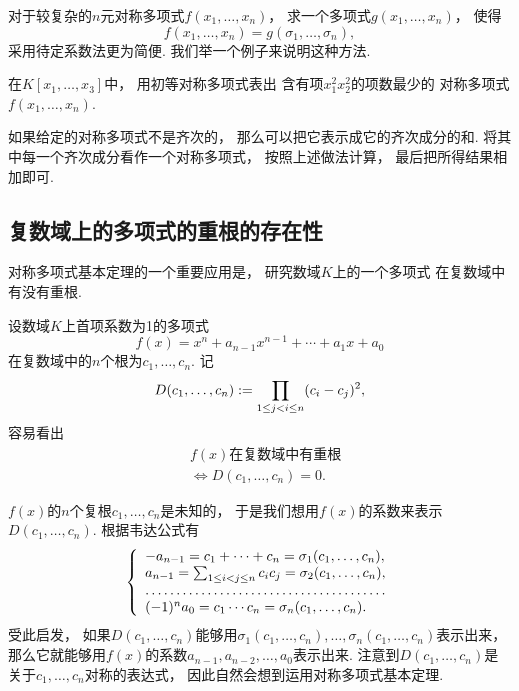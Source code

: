 对于较复杂的\(n\)元对称多项式\(f(x_1,\dotsc,x_n)\)，
求一个多项式\(g(x_1,\dotsc,x_n)\)，
使得\[
	f(x_1,\dotsc,x_n)
	=g(\sigma_1,\dotsc,\sigma_n),
\]
采用待定系数法更为简便.
我们举一个例子来说明这种方法.

\begin{example}
在\(K[x_1,\dotsc,x_3]\)中，
用初等对称多项式表出
含有项\(x_1^2 x_2^2\)的项数最少的
对称多项式\(f(x_1,\dotsc,x_n)\).
\end{example}

如果给定的对称多项式不是齐次的，
那么可以把它表示成它的齐次成分的和.
将其中每一个齐次成分看作一个对称多项式，
按照上述做法计算，
最后把所得结果相加即可.

\subsection{复数域上的多项式的重根的存在性}
对称多项式基本定理的一个重要应用是，
研究数域\(K\)上的一个多项式
在复数域中有没有重根.

设数域\(K\)上首项系数为1的多项式\[
	f(x)=x^n+a_{n-1} x^{n-1}+\dotsb+a_1 x+a_0
\]在复数域中的\(n\)个根为\(c_1,\dotsc,c_n\).
记\[
	D(c_1,\dotsc,c_n)
	:=
	\prod_{1\leq j<i\leq n} (c_i-c_j)^2,
\]
容易看出\begin{align*}
	&\text{$f(x)$在复数域中有重根} \\
	&\iff
	D(c_1,\dotsc,c_n)=0.
\end{align*}

\(f(x)\)的\(n\)个复根\(c_1,\dotsc,c_n\)是未知的，
于是我们想用\(f(x)\)的系数来表示\(D(c_1,\dotsc,c_n)\).
根据韦达公式有\[
	\left\{ \begin{array}{l}
		-a_{n-1}
		=c_1+\dotsb+c_n
		=\sigma_1(c_1,\dotsc,c_n), \\
		a_{n-1}
		=\sum_{1\leq i<j\leq n} c_i c_j
		=\sigma_2(c_1,\dotsc,c_n), \\
		\hdotsfor1 \\
		(-1)^n a_0
		=c_1 \dotsm c_n
		=\sigma_n(c_1,\dotsc,c_n).
	\end{array} \right.
\]
受此启发，
如果\(D(c_1,\dotsc,c_n)\)能够用\(\sigma_1(c_1,\dotsc,c_n),
\dotsc,
\sigma_n(c_1,\dotsc,c_n)\)表示出来，
那么它就能够用\(f(x)\)的系数\(a_{n-1},a_{n-2},\dotsc,a_0\)表示出来.
注意到\(D(c_1,\dotsc,c_n)\)是关于\(c_1,\dotsc,c_n\)对称的表达式，
因此自然会想到运用对称多项式基本定理.

